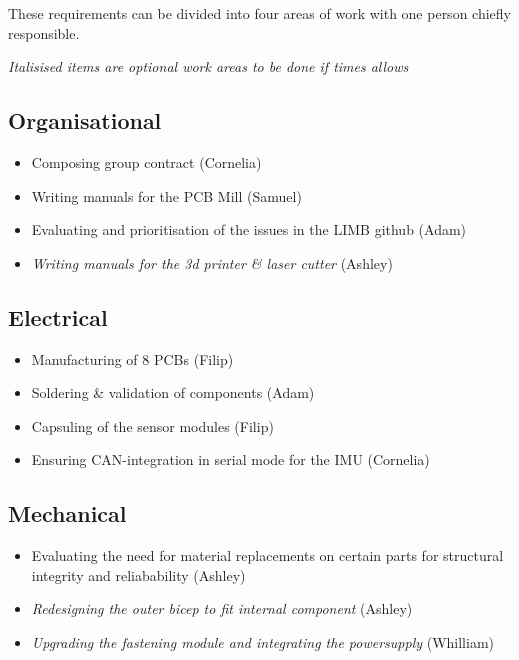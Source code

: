 These requirements can be divided into four areas of work with one person chiefly responsible.

\textit{Italisised items are optional work areas to be done if times allows}

\subsection*{Organisational}
\begin{itemize}
  \item Composing group contract (Cornelia)
  \item Writing manuals for the PCB Mill (Samuel)
  \item Evaluating and prioritisation of the issues in the LIMB github (Adam)
  \item \textit{Writing manuals for the 3d printer \& laser cutter} (Ashley)
\end{itemize}

\subsection*{Electrical}\nopagebreak
\begin{itemize}
  \item Manufacturing of 8 PCBs (Filip)
  \item Soldering \& validation of components (Adam)
  \item Capsuling of the sensor modules (Filip)
  \item Ensuring CAN-integration in serial mode for the IMU (Cornelia)
\end{itemize}

\subsection*{Mechanical}\nopagebreak
\begin{itemize}
  \item Evaluating the need for material replacements on certain parts for structural integrity and reliabability (Ashley)
  \item \textit{Redesigning the outer bicep to fit internal component} (Ashley)
  \item \textit{Upgrading the fastening module and integrating the powersupply} (Whilliam)
\end{itemize}

